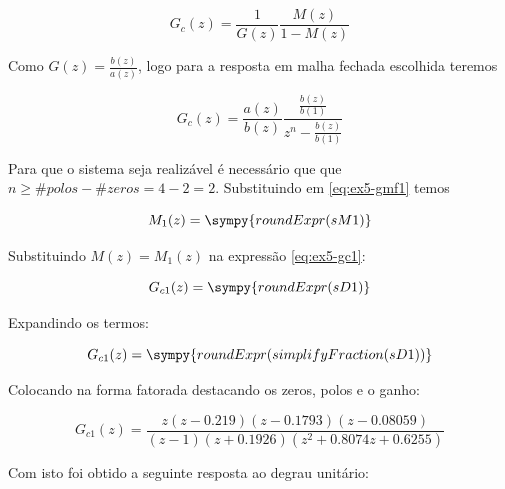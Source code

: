 \documentclass[a4paper,11pt]{article}
\begin{document}
$$
    G_{c}(z) = \frac{1}{G(z)}\frac{M(z)}{1-M(z)}
$$

Como $G(z) = \frac{b(z)}{a(z)}$, logo para a resposta em malha fechada escolhida teremos

\begin{equation}\label{eq:ex5-gc1}
    G_{c}(z) = \frac{a(z)}{b(z)}\frac{\frac{b(z)}{b(1)}}{z^n-\frac{b(z)}{b(1)}}
\end{equation}


Para que o sistema seja realizável é necessário que que $n \ge \#polos - \#zeros = 4  - 2 = 2$. Substituindo em \ref{eq:ex5-gmf1} temos

$$
M_1(z) = \sympy{roundExpr(sM1)}
$$

Substituindo $M(z) = M_1(z)$ na expressão \ref{eq:ex5-gc1}:

$$G_{c1}(z) = \sympy{roundExpr(sD1)}$$

Expandindo os termos:

$$G_{c1}(z) = \sympy{roundExpr(simplifyFraction(sD1))}$$

Colocando na forma fatorada destacando os zeros, polos e o ganho:

\begin{equation}
    G_{c1}(z) = \frac{z (z-0.219) (z-0.1793) (z-0.08059)}{(z-1) (z+0.1926) (z^2 + 0.8074z + 0.6255)}
\end{equation}

Com isto foi obtido a seguinte resposta ao degrau unitário:
\end{document}
